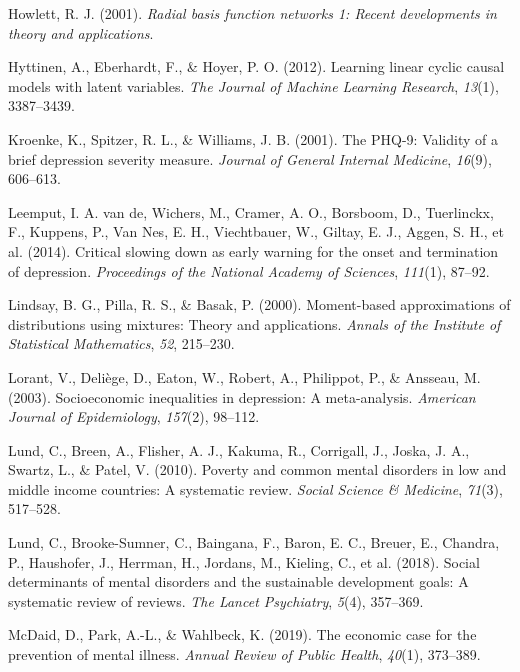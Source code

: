 \documentclass[
]{article}
\newlength{\cslhangindent}
\newenvironment{CSLReferences}[2] %
 {\begin{list}{}{%
  \setlength{\itemindent}{0pt}
  \setlength{\leftmargin}{0pt}
  \setlength{\parsep}{0pt}
  \ifodd #1
   \setlength{\leftmargin}{\cslhangindent}
   \setlength{\itemindent}{-1\cslhangindent}
  \fi
  \setlength{\itemsep}{#2\baselineskip}}}
 {\end{list}}
\begin{document}
\begin{CSLReferences}{1}{0}
Howlett, R. J. (2001). \emph{Radial basis function networks 1: Recent
developments in theory and applications}.

Hyttinen, A., Eberhardt, F., \& Hoyer, P. O. (2012). Learning linear
cyclic causal models with latent variables. \emph{The Journal of Machine
Learning Research}, \emph{13}(1), 3387--3439.

Kroenke, K., Spitzer, R. L., \& Williams, J. B. (2001). The PHQ-9:
Validity of a brief depression severity measure. \emph{Journal of
General Internal Medicine}, \emph{16}(9), 606--613.

Leemput, I. A. van de, Wichers, M., Cramer, A. O., Borsboom, D.,
Tuerlinckx, F., Kuppens, P., Van Nes, E. H., Viechtbauer, W., Giltay, E.
J., Aggen, S. H., et al. (2014). Critical slowing down as early warning
for the onset and termination of depression. \emph{Proceedings of the
National Academy of Sciences}, \emph{111}(1), 87--92.

Lindsay, B. G., Pilla, R. S., \& Basak, P. (2000). Moment-based
approximations of distributions using mixtures: Theory and applications.
\emph{Annals of the Institute of Statistical Mathematics}, \emph{52},
215--230.

Lorant, V., Deliège, D., Eaton, W., Robert, A., Philippot, P., \&
Ansseau, M. (2003). Socioeconomic inequalities in depression: A
meta-analysis. \emph{American Journal of Epidemiology}, \emph{157}(2),
98--112.

Lund, C., Breen, A., Flisher, A. J., Kakuma, R., Corrigall, J., Joska,
J. A., Swartz, L., \& Patel, V. (2010). Poverty and common mental
disorders in low and middle income countries: A systematic review.
\emph{Social Science \& Medicine}, \emph{71}(3), 517--528.

Lund, C., Brooke-Sumner, C., Baingana, F., Baron, E. C., Breuer, E.,
Chandra, P., Haushofer, J., Herrman, H., Jordans, M., Kieling, C., et
al. (2018). Social determinants of mental disorders and the sustainable
development goals: A systematic review of reviews. \emph{The Lancet
Psychiatry}, \emph{5}(4), 357--369.

McDaid, D., Park, A.-L., \& Wahlbeck, K. (2019). The economic case for
the prevention of mental illness. \emph{Annual Review of Public Health},
\emph{40}(1), 373--389.


\end{CSLReferences}
\end{document}

